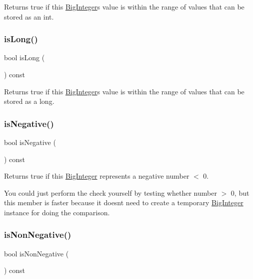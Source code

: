 Returns true if this \mbox{\hyperlink{classBigInteger}{Big\+Integer}}\textquotesingle{}s value is within the range of values that can be stored as an int. 

\mbox{\label{classBigInteger_ae7ab3b45a738cd32270fcdea36953c7b}} 
\subsubsection{\texorpdfstring{is\+Long()}{isLong()}}
{\footnotesize\ttfamily bool is\+Long (\begin{DoxyParamCaption}{ }\end{DoxyParamCaption}) const}



Returns true if this \mbox{\hyperlink{classBigInteger}{Big\+Integer}}\textquotesingle{}s value is within the range of values that can be stored as a long. 

\mbox{\label{classBigInteger_ac14adf29c832575388e1b999a4bd60f5}} 
\subsubsection{\texorpdfstring{is\+Negative()}{isNegative()}}
{\footnotesize\ttfamily bool is\+Negative (\begin{DoxyParamCaption}{ }\end{DoxyParamCaption}) const}



Returns true if this \mbox{\hyperlink{classBigInteger}{Big\+Integer}} represents a negative number $<$ 0. 

You could just perform the check yourself by testing whether number $>$ 0, but this member is faster because it doesn\textquotesingle{}t need to create a temporary \mbox{\hyperlink{classBigInteger}{Big\+Integer}} instance for doing the comparison. \mbox{\label{classBigInteger_a2f8d83e07bed3c6477d597a01fc1213d}} 
\subsubsection{\texorpdfstring{is\+Non\+Negative()}{isNonNegative()}}
{\footnotesize\ttfamily bool is\+Non\+Negative (\begin{DoxyParamCaption}{ }\end{DoxyParamCaption}) const}



